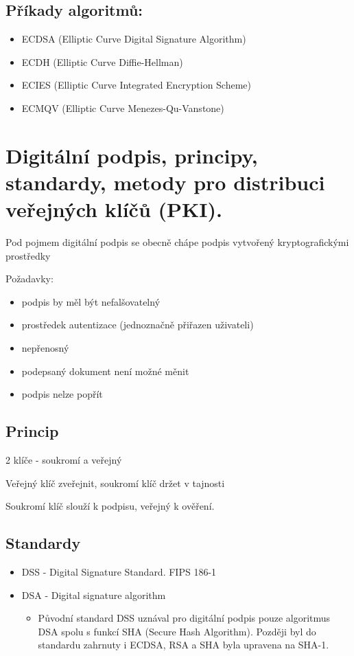 \subsection{Příkady algoritmů:}
\begin{itemize}
    \item ECDSA (Elliptic Curve Digital Signature Algorithm)
    \item ECDH (Elliptic Curve Diffie-Hellman)
    \item ECIES (Elliptic Curve Integrated Encryption Scheme)
    \item ECMQV (Elliptic Curve Menezes-Qu-Vanstone)
\end{itemize}

\clearpage
\section{Digitální podpis, principy, standardy, metody pro distribuci veřejných klíčů (PKI).}
 
Pod pojmem digitální podpis se obecně chápe podpis vytvořený kryptografickými prostředky

Požadavky:
\begin{itemize}
    \item podpis by měl být nefalšovatelný
    \item prostředek autentizace (jednoznačně přiřazen uživateli)
    \item nepřenosný
    \item podepsaný dokument není možné měnit
    \item podpis nelze popřít
\end{itemize}

\subsection{Princip}
2 klíče - soukromí a veřejný

Veřejný klíč zveřejnit, soukromí klíč držet v tajnosti

Soukromí klíč slouží k podpisu, veřejný k ověření.

\subsection{Standardy}
\begin{itemize}
    \item DSS - Digital Signature Standard. FIPS 186-1 
    \item DSA - Digital signature algorithm
    \begin{itemize}
        \item Původní standard DSS uznával pro digitální podpis pouze algoritmus DSA spolu s funkcí SHA (Secure Hash Algorithm). Později byl do standardu zahrnuty i ECDSA, RSA a SHA byla upravena na SHA-1.
    \end{itemize}
\end{itemize}

